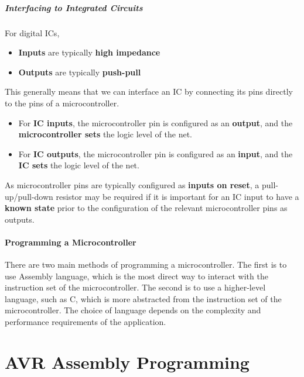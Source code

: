 \documentclass{article}
\begin{document}
\subsubsection{Interfacing to Integrated Circuits}
For digital ICs,
\begin{itemize}
    \item \textbf{Inputs} are typically \textbf{high impedance}
    \item \textbf{Outputs} are typically \textbf{push-pull}
\end{itemize}
This generally means that we can interface an IC by connecting its pins directly to the pins of a microcontroller.
\begin{itemize}
    \item For \textbf{IC inputs}, the microcontroller pin is configured
          as an \textbf{output}, and the \textbf{microcontroller sets}
          the logic level of the net.
    \item For \textbf{IC outputs}, the microcontroller pin is
          configured as an \textbf{input}, and the \textbf{IC sets} the
          logic level of the net.
\end{itemize}
As microcontroller pins are typically configured as \textbf{inputs on reset}, a
pull-up/pull-down resistor may be required if it is important for an IC input to
have a \textbf{known state} prior to the configuration of the relevant microcontroller pins as outputs.
\subsection{Programming a Microcontroller}
There are two main methods of programming a microcontroller. The first
is to use Assembly language, which is the most direct way to interact
with the instruction set of the microcontroller. The second is to use a
higher-level language, such as C, which is more abstracted from the
instruction set of the microcontroller. The choice of language depends
on the complexity and performance requirements of the application.
\part{AVR Assembly Programming}
\end{document}
